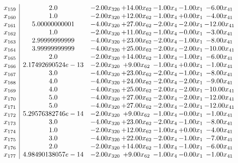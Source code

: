 \documentclass[8pt]{article}
\begin{document}
\[\begin{array}{c| c c@{\hskip 2pt} c@{\hskip 2pt} c@{\hskip 2pt} c@{\hskip 2pt} c@{\hskip 2pt} }
 x_{159}   &  2.0 & -2.00 x_{320} & + 14.00 x_{62} & -1.00 x_{4} & -1.00 x_{1} & -6.00 x_{41}\\
 x_{160}   &  1.0 & -2.00 x_{320} & + 12.00 x_{62} & -1.00 x_{4} & +  0.00 x_{1} & -4.00 x_{41}\\
 x_{161}   &  5.00000000001 & -4.00 x_{320} & + 27.00 x_{62} & -2.00 x_{4} & -2.00 x_{1} & -12.00 x_{41}\\
 x_{162}   &  1.0 & -2.00 x_{320} & + 11.00 x_{62} & -1.00 x_{4} & -0.00 x_{1} & -3.00 x_{41}\\
 x_{163}   &  2.99999999999 & -4.00 x_{320} & + 23.00 x_{62} & -2.00 x_{4} & -1.00 x_{1} & -8.00 x_{41}\\
 x_{164}   &  3.99999999999 & -4.00 x_{320} & + 25.00 x_{62} & -2.00 x_{4} & -2.00 x_{1} & -10.00 x_{41}\\
 x_{165}   &  2.0 & -2.00 x_{320} & + 14.00 x_{62} & -1.00 x_{4} & -1.00 x_{1} & -6.00 x_{41}\\
 x_{166}   &  2.17492690524e-13 & -2.00 x_{320} & +  9.00 x_{62} & -1.00 x_{4} & +  0.00 x_{1} & -1.00 x_{41}\\
 x_{167}   &  3.0 & -4.00 x_{320} & + 23.00 x_{62} & -2.00 x_{4} & -1.00 x_{1} & -8.00 x_{41}\\
 x_{168}   &  4.0 & -4.00 x_{320} & + 24.00 x_{62} & -2.00 x_{4} & -2.00 x_{1} & -9.00 x_{41}\\
 x_{169}   &  4.0 & -4.00 x_{320} & + 25.00 x_{62} & -2.00 x_{4} & -2.00 x_{1} & -10.00 x_{41}\\
 x_{170}   &  5.0 & -4.00 x_{320} & + 27.00 x_{62} & -2.00 x_{4} & -2.00 x_{1} & -12.00 x_{41}\\
 x_{171}   &  5.0 & -4.00 x_{320} & + 27.00 x_{62} & -2.00 x_{4} & -2.00 x_{1} & -12.00 x_{41}\\
 x_{172}   &  5.29576382746e-14 & -2.00 x_{320} & +  9.00 x_{62} & -1.00 x_{4} & -0.00 x_{1} & -1.00 x_{41}\\
 x_{173}   &  3.0 & -4.00 x_{320} & + 23.00 x_{62} & -2.00 x_{4} & -1.00 x_{1} & -8.00 x_{41}\\
 x_{174}   &  1.0 & -2.00 x_{320} & + 12.00 x_{62} & -1.00 x_{4} & +  0.00 x_{1} & -4.00 x_{41}\\
 x_{175}   &  3.0 & -4.00 x_{320} & + 22.00 x_{62} & -2.00 x_{4} & -1.00 x_{1} & -7.00 x_{41}\\
 x_{176}   &  2.0 & -2.00 x_{320} & + 14.00 x_{62} & -1.00 x_{4} & -1.00 x_{1} & -6.00 x_{41}\\
 x_{177}   &  4.98490138057e-14 & -2.00 x_{320} & +  9.00 x_{62} & -1.00 x_{4} & -0.00 x_{1} & -1.00 x_{41}\\

\end{array}\]
\end{document}
